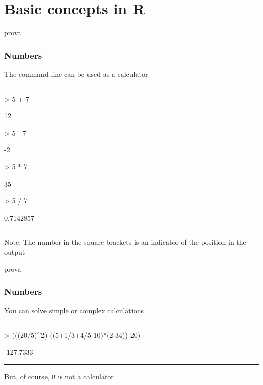 \documentclass{beamer}
\begin{document}
\section{Basic concepts in R}

\begin{frame}[fragile]{prova}
	\frametitle{Numbers}
	The command line can be used as a calculator
\rule{\textwidth}{0.4pt}
\begin{Schunk}
\begin{Sinput}
> 5 + 7 
\end{Sinput}
\begin{Soutput}
[1] 12
\end{Soutput}
\begin{Sinput}
> 5 - 7
\end{Sinput}
\begin{Soutput}
[1] -2
\end{Soutput}
\begin{Sinput}
> 5 * 7
\end{Sinput}
\begin{Soutput}
[1] 35
\end{Soutput}
\begin{Sinput}
> 5 / 7
\end{Sinput}
\begin{Soutput}
[1] 0.7142857
\end{Soutput}
\end{Schunk}
\rule{\textwidth}{0.4pt}
\vspace{5pt}
\small Note: The number in the square brackets is an indicator of the position in the output
\end{frame}

\begin{frame}[fragile]{prova}
	\frametitle{Numbers}
	You can solve simple or complex calculations 
	\rule{\textwidth}{0.4pt}
\begin{Schunk}
\begin{Sinput}
> (((20/5)^2)-((5+1/3+4/5-10)*(2-34))-20)
\end{Sinput}
\begin{Soutput}
[1] -127.7333
\end{Soutput}
\end{Schunk}
\rule{\textwidth}{0.4pt}
\vspace{20pt}
\Large But, of course, \texttt{R} is not a calculator
\end{frame}
\end{document}
